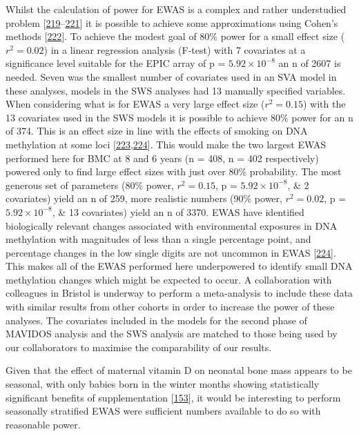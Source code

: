 \documentclass[
]{book}
\begin{document}
Whilst the calculation of power for EWAS is a complex and rather understudied problem {[}\protect\hyperlink{ref-Wang2011}{219}--\protect\hyperlink{ref-Graw2019}{221}{]} it is possible to achieve some approximations using Cohen's methods {[}\protect\hyperlink{ref-Cohen1988}{222}{]}.
To achieve the modest goal of 80\% power for a small effect size (\(r^2 = 0.02\)) in a linear regression analysis (F-test) with 7 covariates at a significance level suitable for the EPIC array of p = \(5.92\times10^{-8}\) an n of 2607 is needed.
Seven was the smallest number of covariates used in an SVA model in these analyses, models in the SWS analyses had 13 manually specified variables.
When considering what is for EWAS a very large effect size (\(r^2 = 0.15\)) with the 13 covariates used in the SWS models it is possible to achieve 80\% power for an n of 374.
This is an effect size in line with the effects of smoking on DNA methylation at some loci {[}\protect\hyperlink{ref-Joubert2016}{223},\protect\hyperlink{ref-Breton2017}{224}{]}.
This would make the two largest EWAS performed here for BMC at 8 and 6 years (n = 408, n = 402 respectively) powered only to find large effect sizes with just over 80\% probability.
The most generous set of parameters (80\% power, \(r^2 = 0.15\), p = \(5.92\times10^{-8}\), \& 2 covariates) yield an n of 259, more realistic numbers (90\% power, \(r^2 = 0.02\), p = \(5.92\times10^{-8}\), \& 13 covariates) yield an n of 3370.
EWAS have identified biologically relevant changes associated with environmental exposures in DNA methylation with magnitudes of less than a single percentage point, and percentage changes in the low single digits are not uncommon in EWAS {[}\protect\hyperlink{ref-Breton2017}{224}{]}.
This makes all of the EWAS performed here underpowered to identify small DNA methylation changes which might be expected to occur.
A collaboration with colleagues in Bristol is underway to perform a meta-analysis to include these data with similar results from other cohorts in order to increase the power of these analyses.
The covariates included in the models for the second phase of MAVIDOS analysis and the SWS analysis are matched to those being used by our collaborators to maximise the comparability of our results.

Given that the effect of maternal vitamin D on neonatal bone mass appears to be seasonal, with only babies born in the winter months showing statistically significant benefits of supplementation {[}\protect\hyperlink{ref-Cooper2016}{153}{]}, it would be interesting to perform seasonally stratified EWAS were sufficient numbers available to do so with reasonable power.
\end{document}
